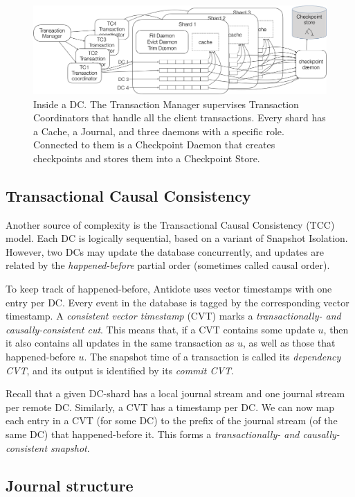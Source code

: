 \documentclass[twoside]{article}
\begin{document}
\begin{figure}[tp]
  \centering
  \includegraphics[width=1\textwidth]{figures/insidedc.png}
  \caption{Inside a DC. The Transaction Manager supervises Transaction 
  Coordinators that handle all the client transactions. Every shard has a 
  Cache, a Journal, and three daemons with a specific role. Connected to 
  them is a Checkpoint Daemon that creates checkpoints and stores them 
  into a Checkpoint Store.}
  \label{fig:insidedc}
\end{figure}

\subsection{Transactional Causal Consistency}
\label{sec:tcc}

Another source of complexity is the Transactional Causal Consistency
(TCC) model.
Each DC is logically sequential, based on a variant of Snapshot
Isolation.
However, two DCs may update the database concurrently, and updates are
related by the \emph{happened-before} partial order (sometimes called
causal order).

To keep track of happened-before, Antidote uses vector
timestamps with one entry per DC\@.
Every event in the database is tagged by the corresponding vector
timestamp.
A \emph{consistent vector timestamp} (CVT) marks a \emph{transactionally- and
causally-consistent cut}.
This means that, if a CVT contains some update $u$, then it also contains all
updates in the same transaction as $u$, as well as those that
happened-before $u$. 
The snapshot time of a transaction is called its \emph{dependency
CVT}, and its output is identified by its \emph{commit CVT}.

Recall that a given DC-shard has a local journal stream and one journal
stream per remote DC\@.
Similarly, a CVT has a timestamp per DC\@.
We can now map each entry in a CVT (for some DC) to the prefix of the
journal stream (of the same DC) that happened-before it.
This forms a \emph{transactionally- and causally-consistent snapshot}.


\subsection{Journal structure}
\label{sec:journal}
\end{document}
